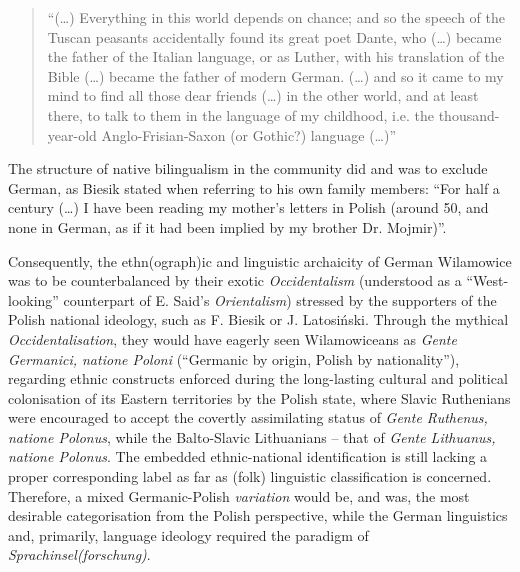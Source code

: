 \documentclass[output=paper]{langscibook}
\begin{document}
\begin{quote}
    “(\ldots) Everything in this world depends on chance; and so the speech of the Tuscan peasants accidentally found its great poet Dante, who (\ldots) became the father of the Italian language, or as Luther, with his translation of the Bible (\ldots) became the father of modern German. (\ldots) and so it came to my mind to find all those dear friends (\ldots) in the other world, and at least there, to talk to them in the language of my childhood, i.e. the thousand-year-old Anglo-Frisian-Saxon (or Gothic?) language (\ldots)”
\end{quote}

The structure of native bilingualism in the community did and was to exclude German, as Biesik stated when referring to his own family members: “For half a century (\ldots) I have been reading my mother's letters in Polish (around 50, and none in German, as if it had been implied by my brother Dr. Mojmir)”.

Consequently, the ethn(ograph)ic and linguistic archaicity of German Wilamowice was to be counterbalanced by their exotic \textit{Occidentalism} (understood as a “West-looking” counterpart of E. Said’s \textit{Orientalism}) stressed by the supporters of the Polish national ideology, such as F. Biesik or J. Latosiński. Through the mythical \textit{Occidentalisation}, they would have eagerly seen Wilamowiceans as \textit{Gente Germanici, natione Poloni} (“Germanic by origin, Polish by nationality”), regarding ethnic constructs enforced during the long-lasting cultural and political colonisation of its Eastern territories by the Polish state, where Slavic Ruthenians were encouraged to accept the covertly assimilating status of \textit{Gente Ruthenus, natione Polonus}, while the Balto-Slavic Lithuanians – that of \textit{Gente Lithuanus, natione Polonus}. The embedded ethnic-national identification is still lacking a proper corresponding label as far as (folk) linguistic classification is concerned. Therefore, a mixed Germanic-Polish \textit{variation} would be, and was, the most desirable categorisation from the Polish perspective, while the German linguistics and, primarily, language ideology required the paradigm of \textit{Sprachinsel(forschung)}.
\end{document}

